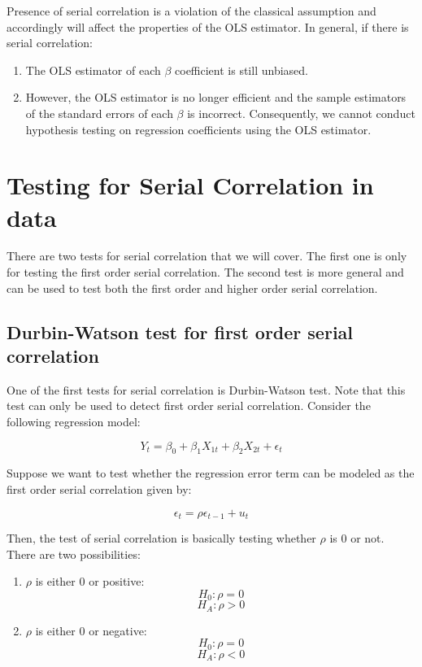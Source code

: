 \documentclass[
]{book}
\theoremstyle{definition}
\theoremstyle{definition}
\theoremstyle{definition}
\theoremstyle{definition}
\theoremstyle{remark}
\begin{document}
Presence of serial correlation is a violation of the classical assumption and accordingly will affect the properties of the OLS estimator. In general, if there is serial correlation:

\begin{enumerate}
\def\labelenumi{\arabic{enumi}.}
\item
  The OLS estimator of each \(\beta\) coefficient is still unbiased.
\item
  However, the OLS estimator is no longer efficient and the sample estimators of the standard errors of each \(\beta\) is incorrect. Consequently, we cannot conduct hypothesis testing on regression coefficients using the OLS estimator.
\end{enumerate}

\hypertarget{testing-for-serial-correlation-in-data}{%
\section{Testing for Serial Correlation in data}\label{testing-for-serial-correlation-in-data}}

There are two tests for serial correlation that we will cover. The first one is only for testing the first order serial correlation. The second test is more general and can be used to test both the first order and higher order serial correlation.

\hypertarget{durbin-watson-test-for-first-order-serial-correlation}{%
\subsection{Durbin-Watson test for first order serial correlation}\label{durbin-watson-test-for-first-order-serial-correlation}}

One of the first tests for serial correlation is Durbin-Watson test. Note that this test can only be used to detect first order serial correlation. Consider the following regression model:

\[Y_t = \beta_0 + \beta_1 X_{1t} + \beta_2 X_{2t} + \epsilon_t\]

Suppose we want to test whether the regression error term can be modeled as the first order serial correlation given by:

\[\epsilon_t = \rho \epsilon_{t-1} + u_t\]

Then, the test of serial correlation is basically testing whether \(\rho\) is 0 or not. There are two possibilities:

\begin{enumerate}
\def\labelenumi{\arabic{enumi}.}
\item
  \(\rho\) is either 0 or positive:\[H_0: \rho=0\] \[H_A: \rho>0\]
\item
  \(\rho\) is either 0 or negative:\[H_0: \rho=0\] \[H_A: \rho<0\]
\end{enumerate}
\end{document}
